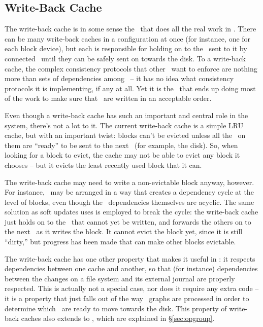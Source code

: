 \subsection{Write-Back Cache}
\label{sec:modules:wbcache}

The write-back cache is in some sense the \module\ that does all the real work
in \Kudos. There can be many write-back caches in a configuration at once (for
instance, one for each block device), but each is responsible for holding on to
the \chdescs\ sent to it by connected \modules\ until they can be safely sent on
towards the disk. To a write-back cache, the complex consistency protocols that
other \modules\ want to enforce are nothing more than sets of dependencies among
\chdescs\ -- it has no idea what consistency protocols it is implementing, if
any at all. Yet it is the \module\ that ends up doing most of the work to make
sure that \chdescs\ are written in an acceptable order.

Even though a write-back cache has such an important and central role in the
system, there's not a lot to it. The current write-back cache is a simple LRU
cache, but with an important twist: blocks can't be evicted unless all the
\chdescs\ on them are ``ready'' to be sent to the next \module\ (for example,
the disk). So, when looking for a block to evict, the cache may not be able to
evict any block it chooses -- but it evicts the least recently used block that
it can.

The write-back cache may need to write a non-evictable block anyway, however.
For instance, \chdescs\ may be arranged in a way that creates a dependency cycle
at the level of blocks, even though the \chdesc\ dependencies themselves are
acyclic. The same solution as soft updates uses is employed to break the cycle:
the write-back cache just holds on to the \chdescs\ that cannot yet be written,
and forwards the others on to the next \module\ as it writes the block. It
cannot evict the block yet, since it is still ``dirty,'' but progress has been
made that can make other blocks evictable.

The write-back cache has one other property that makes it useful in \Kudos: it
respects dependencies between one cache and another, so that (for instance)
dependencies between the changes on a file system and its external journal are
properly respected. This is actually not a special case, nor does it require any
extra code -- it is a property that just falls out of the way \chdesc\ graphs
are processed in order to determine which \chdescs\ are ready to move towards
the disk. This property of write-back caches also extends to \opgroups, which
are explained in \S\ref{sec:opgroup}.

